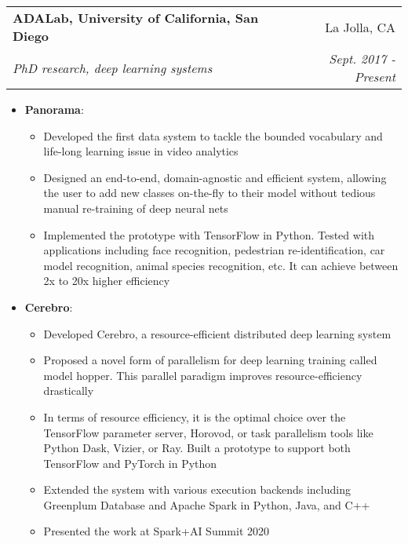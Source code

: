 \documentclass[letterpaper,11pt]{article}
\makeatletter
\newcommand{\resumeItem}[2]{
 \item\small{
  \textbf{#1}{: #2 \vspace{-2pt}}
 }
}
\newcommand{\resumeSubheading}[4]{
 \vspace{-1pt}\item
  \begin{tabular*}{0.97\textwidth}[t]{l@{\extracolsep{\fill}}r}
   \textbf{#1} & #2 \\
   \textit{\small#3} & \textit{\small #4}
  \end{tabular*}\vspace{-5pt}
}
\newcommand{\resumeItemListStart}{\begin{itemize}}
\newcommand{\resumeItemListEnd}{\end{itemize}\vspace{-5pt}}
\makeatother
\begin{document}
  \resumeSubheading
   {ADALab, University of California, San Diego}{La Jolla, CA}
   {PhD research, deep learning systems}{Sept. 2017 - Present}
   
   \resumeItemListStart
    \resumeItem{Panorama}
     {}
     {\small
      \begin{itemize}
         \item Developed the first data system to tackle the bounded vocabulary and life-long learning issue in video analytics \vspace{-2pt}
        	 \item Designed an end-to-end, domain-agnostic and efficient system, allowing the user to add new classes on-the-fly to their model without tedious manual re-training of deep neural nets \vspace{-2pt}
	     \item Implemented the prototype with TensorFlow in Python. Tested with applications including face recognition, pedestrian re-identification, car model recognition, animal species recognition, etc. It can achieve between 2x to 20x higher efficiency \vspace{-2pt}
      \end{itemize}
     }
     \resumeItem{Cerebro}
     {}
     {\small 
     \begin{itemize}
         \item Developed Cerebro, a resource-efficient distributed deep learning system \vspace{-2pt}
        	 \item Proposed a novel form of parallelism for deep learning training called model hopper. This parallel paradigm improves resource-efficiency drastically\vspace{-2pt}
	     \item In terms of resource efficiency, it is the optimal choice over the TensorFlow parameter server, Horovod, or task parallelism tools like Python Dask, Vizier, or Ray. Built a prototype to support both TensorFlow and PyTorch in Python\vspace{-2pt}
	     \item Extended the system with various execution backends including Greenplum Database and Apache Spark in Python, Java, and C++
	     \item Presented the work at Spark+AI Summit 2020
      \end{itemize}\vspace{-5pt}
      }
   \resumeItemListEnd
\end{document}
